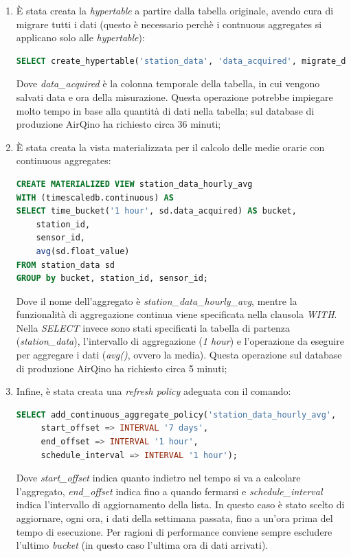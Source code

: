 \begin{enumerate}
  \item È stata creata la \textit{hypertable} a partire dalla tabella originale, avendo cura di migrare tutti i dati (questo è necessario perchè i contnuous aggregates si applicano solo alle \textit{hypertable}):
\vspace{1mm}
\begin{lstlisting}[language=sql]
SELECT create_hypertable('station_data', 'data_acquired', migrate_data => true);
\end{lstlisting}
Dove \textit{data\_acquired} è la colonna temporale della tabella, in cui vengono salvati data e ora della misurazione.
Questa operazione potrebbe impiegare molto tempo in base alla quantità di dati nella tabella; sul database di produzione AirQino ha richiesto circa 36 minuti;
  \item È stata creata la vista materializzata per il calcolo delle medie orarie con continuous aggregates:
\vspace{1mm}
\begin{lstlisting}[language=sql]
CREATE MATERIALIZED VIEW station_data_hourly_avg
WITH (timescaledb.continuous) AS
SELECT time_bucket('1 hour', sd.data_acquired) AS bucket, 
    station_id,  
    sensor_id, 
    avg(sd.float_value) 
FROM station_data sd
GROUP by bucket, station_id, sensor_id;
\end{lstlisting}
Dove il nome dell'aggregato è \textit{station\_data\_hourly\_avg}, mentre la funzionalità di aggregazione continua viene specificata nella clausola \textit{WITH}. Nella \textit{SELECT} invece sono stati specificati la tabella di partenza (\textit{station\_data}), l'intervallo di aggregazione (\textit{1 hour}) e l'operazione da eseguire per aggregare i dati (\textit{avg()}, ovvero la media).
Questa operazione sul database di produzione AirQino ha richiesto circa 5 minuti;
  \item Infine, è stata creata una \textit{refresh policy} adeguata con il comando:
\vspace{1mm}
\begin{lstlisting}[language=sql]
SELECT add_continuous_aggregate_policy('station_data_hourly_avg',
     start_offset => INTERVAL '7 days',
     end_offset => INTERVAL '1 hour',
     schedule_interval => INTERVAL '1 hour');
\end{lstlisting}
Dove \textit{start\_offset} indica quanto indietro nel tempo si va a calcolare l'aggregato, \textit{end\_offset} indica fino a quando fermarsi e \textit{schedule\_interval} indica l'intervallo di aggiornamento della lista.
In questo caso è stato scelto di aggiornare, ogni ora, i dati della settimana passata, fino a un'ora prima del tempo di esecuzione.
Per ragioni di performance conviene sempre escludere l'ultimo \textit{bucket} (in questo caso l'ultima ora di dati arrivati). \cite{timescale_ca}
\end{enumerate}

